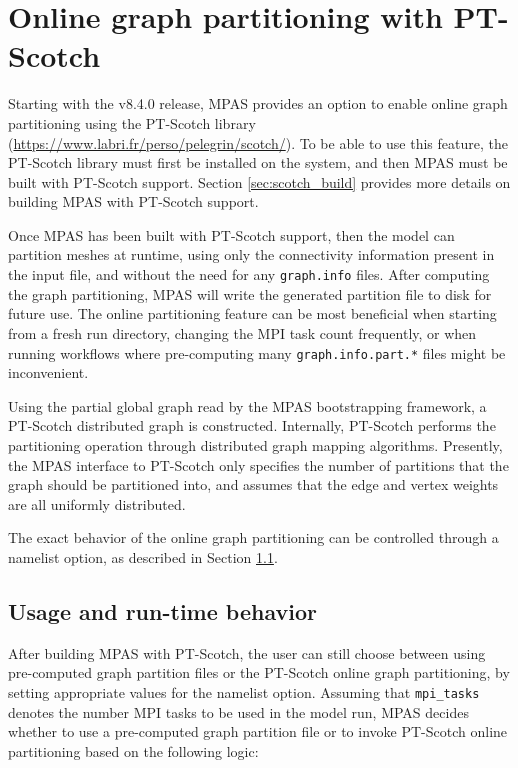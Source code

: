 \section{Online graph partitioning with PT-Scotch}
\label{sec:scotch_running}
Starting with the v8.4.0 release, MPAS provides an option to enable online graph partitioning using the PT-Scotch library
(\url{https://www.labri.fr/perso/pelegrin/scotch/}). To be able to use this feature, the PT-Scotch library
must first be installed on the system, and then MPAS must be built with PT-Scotch support. Section \ref{sec:scotch_build} provides more details on building MPAS with PT-Scotch support.

Once MPAS has been built with PT-Scotch support, then the model can partition meshes at runtime, using only the connectivity information
present in the input file, and without the need for any {\tt graph.info} files. After computing the graph partitioning,
MPAS will write the generated partition file to disk for future use. The online partitioning feature can be most beneficial when starting from a fresh run directory, changing the
MPI task count frequently, or when running workflows where pre-computing many {\tt graph.info.part.*} files might be inconvenient.

Using the partial global graph read by the MPAS bootstrapping framework, a PT-Scotch distributed graph is constructed.
Internally, PT-Scotch performs the partitioning operation through distributed graph mapping algorithms. Presently, the
MPAS interface to PT-Scotch only specifies the number of partitions that the graph should be partitioned into, and assumes
that the edge and vertex weights are all uniformly distributed. 
 
The exact behavior of the online graph partitioning can be controlled through a namelist option, as described in Section \ref{sec:scotch_runtime_behavior}.


\subsection{Usage and run-time behavior}
\label{sec:scotch_runtime_behavior}
After building MPAS with PT-Scotch, the user can still choose between using pre-computed graph partition files or the PT-Scotch online graph partitioning,
by setting appropriate values for the  namelist option. Assuming that {\tt mpi\_tasks} denotes the number 
MPI tasks to be used in the model run, MPAS decides whether to use a pre-computed graph partition file or to invoke PT-Scotch online partitioning based on the following logic:

